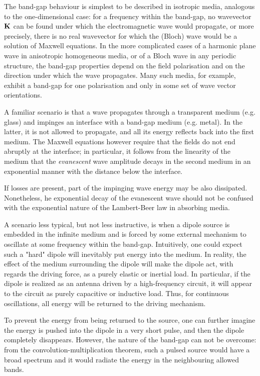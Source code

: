 The band-gap behaviour is simplest to be described in isotropic media, analogous to the one-dimensional case: for a frequency within the band-gap, no wavevector ${\mathbf{K}}$ can be found under which the electromagnetic wave would propagate, or more precisely, there is no real wavevector for which the (Bloch) wave would be a solution of Maxwell equations. In the more complicated cases of a harmonic plane wave in anisotropic homogeneous media, or of a Bloch wave in any periodic structure, the band-gap properties depend on the field polarisation and on the direction under which the wave propagates. Many such media, for example, exhibit a band-gap for one polarisation and only in some set of wave vector orientations.

A familiar scenario is that a wave propagates through a transparent medium (e.g. glass) and impinges an interface with a band-gap medium (e.g. metal). In the latter, it is not allowed to propagate, and all its energy reflects back into the first medium. The Maxwell equations however require that the fields do not end abruptly at the interface; in particular, it follows from the linearity of the medium that the \textit{evanescent} wave amplitude decays in the second medium in an exponential manner with the distance below the interface.

If losses are present, part of the impinging wave energy may be also dissipated. Nonetheless, he exponential decay of the evanescent wave should not be confused with the exponential nature of the Lambert-Beer law in absorbing media.

A scenario less typical, but not less instructive, is when a dipole source is embedded in the infinite medium and is forced by some external mechanism to oscillate at some frequency within the band-gap. Intuitively, one could expect such a "hard" dipole will inevitably put energy into the medium. In reality, the effect of the medium surrounding the dipole will make the dipole act, with regards the driving force, as a purely elastic or inertial load. In particular, if the dipole is realized as an antenna driven by a high-frequency circuit, it will appear to the circuit as purely capacitive or inductive load. Thus, for continuous oscillations, all energy will be returned to the driving mechanism. 

To prevent the energy from being returned to the source, one can further imagine the energy is pushed into the dipole in a very short pulse, and then the dipole completely disappears. However, the nature of the band-gap can not be overcome: from the convolution-multiplication theorem, such a pulsed source would have a broad spectrum and it would radiate the energy in the neighbouring allowed bands. 

